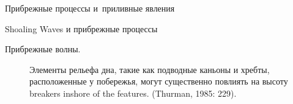 \begin{chapter}{Прибрежные процессы и~приливные явления}
\begin{section}{Shoaling Waves и прибрежные процессы}
\begin{paragraph}{Прибрежные волны.}
\begin{figure}[b!]
\begin{centering}
\end{centering}
\caption{Элементы рельефа дна, такие как подводные каньоны и хребты,
расположенные у побережья, могут существенно повлиять на высоту 
breakers inshore of the features. 
(Thurman, 1985: 229).}
\label{wavefocusing}
\end{figure}
%
%


\end{paragraph}
\end{section}
\end{chapter}
